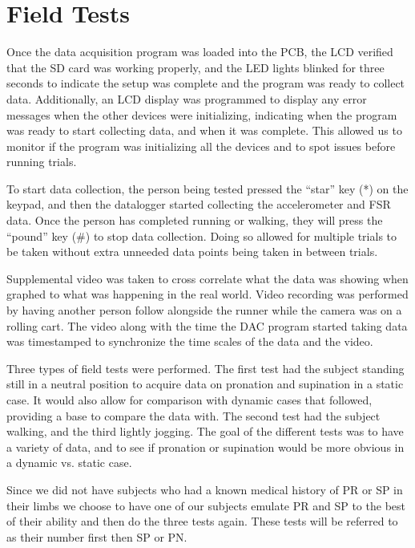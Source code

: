 \section{Field Tests}
Once the data acquisition program was loaded into the PCB, the LCD verified that the SD card was working properly, and the LED lights blinked for three seconds to indicate the setup was complete and the program was ready to collect data.
Additionally, an LCD display was programmed to display any error messages when the other devices were initializing, indicating when the program was ready to start collecting data, and when it was complete.
This allowed us to monitor if the program was initializing all the devices and to spot issues before running trials.\par
To start data collection, the person being tested pressed the “star” key (*) on the keypad, and then the datalogger started collecting the accelerometer and FSR data.
Once the person has completed running or walking, they will press the “pound” key (\#) to stop data collection.
Doing so allowed for multiple trials to be taken without extra unneeded data points being taken in between trials.\par
Supplemental video was taken to cross correlate what the data was showing when graphed to what was happening in the real world.
Video recording was performed by having another person follow alongside the runner while the camera was on a rolling cart.
The video along with the time the DAC program started taking data was timestamped to synchronize the time scales of the data and the video.\par
Three types of field tests were performed.
The first test had the subject standing still in a neutral position to acquire data on pronation and supination in a static case.
It would also allow for comparison with dynamic cases that followed, providing a base to compare the data with.
The second test had the subject walking, and the third lightly jogging.
The goal of the different tests was to have a variety of data, and to see if pronation or supination would be more obvious in a dynamic vs. static case.\par
Since we did not have subjects who had a known medical history of PR or SP in their limbs we choose to have one of our subjects emulate PR and SP to the best of their ability and then do the three tests again.
These tests will be referred to as their number first then SP or PN.
